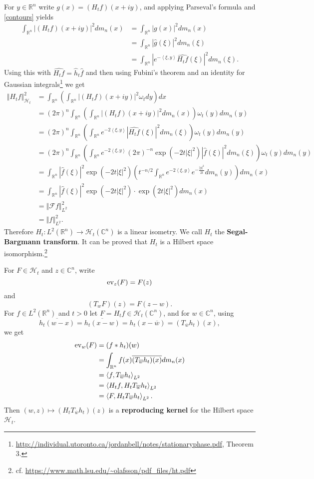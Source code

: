 \documentclass{article}
\newcommand{\inner}[2]{\left\langle #1, #2 \right\rangle}
\newcommand{\ev}{\ensuremath\mathrm{ev}}
\newcommand{\norm}[1]{\left\Vert #1 \right\Vert}
\theoremstyle{definition}
\begin{document}
For $y \in \mathbb{R}^n$ write $g(x)=(H_t f)(x+iy)$, and  
 applying Parseval's formula and
\eqref{contours} yields
\begin{align*}
\int_{\mathbb{R}^n} |(H_t f)(x+iy)|^2 dm_n(x)&= \int_{\mathbb{R}^n} |g(x)|^2 dm_n(x)\\
&=\int_{\mathbb{R}^n} |\widehat{g}(\xi)|^2 dm_n(\xi)\\
&=\int_{\mathbb{R}^n} |e^{-\inner{\xi}{y}} \widehat{H_t f}(\xi)|^2 dm_n(\xi).
\end{align*}
Using this with $\widehat{H_t f} = \widehat{h}_t \widehat{f}$ and then using Fubini's
theorem and an identity for Gaussian integrals\footnote{\url{http://individual.utoronto.ca/jordanbell/notes/stationaryphase.pdf},
Theorem 3.} we get
\begin{align*}
\norm{H_t f}_{\mathcal{H}_t}^2&=\int_{\mathbb{R}^n} \left( \int_{\mathbb{R}^n}
 |(H_t f)(x+iy)|^2 \omega_t dy \right) dx\\
 &=(2\pi)^n \int_{\mathbb{R}^n} \left( \int_{\mathbb{R}^n} |(H_t f)(x+iy)|^2 dm_n(x) \right) \omega_t(y)
 dm_n(y)\\
 &=(2\pi)^n \int_{\mathbb{R}^n} \left( \int_{\mathbb{R}^n}
 e^{-2\inner{\xi}{y}} |\widehat{H_t f}(\xi)|^2 dm_n(\xi)\right) \omega_t(y) dm_n(y)\\
 &=(2\pi)^n \int_{\mathbb{R}^n} \left( \int_{\mathbb{R}^n} e^{-2\inner{\xi}{y}} (2\pi)^{-n} \exp(-2t|\xi|^2)
 |\widehat{f}(\xi)|^2 dm_n(\xi)\right) \omega_t(y) dm_n(y)\\
 &=\int_{\mathbb{R}^n}   |\widehat{f}(\xi)|^2 \exp(-2t|\xi|^2)  \left(t^{-n/2} \int_{\mathbb{R}^n} 
 e^{-2\inner{\xi}{y}}  e^{-\frac{|y|^2}{2t}}dm_n(y) \right)dm_n(x)\\
 &=\int_{\mathbb{R}^n}   |\widehat{f}(\xi)|^2 \exp(-2t|\xi|^2) \cdot  \exp(2t|\xi|^2) dm_n(x)\\
 &=\norm{\mathscr{F}f}_{L^2}^2\\
 &=\norm{f}_{L^2}^2.
\end{align*}
Therefore $H_t:L^2(\mathbb{R}^n) \to \mathcal{H}_t(\mathbb{C}^n)$ is a linear
isometry. 
We call $H_t$ the \textbf{Segal-Bargmann transform}. It can be proved that $H_t$ is a Hilbert space isomorphism.\footnote{cf.
\url{https://www.math.lsu.edu/~olafsson/pdf_files/ht.pdf}}


For $F \in \mathcal{H}_t$ and $z \in \mathbb{C}^n$, write
\[
\ev_z(F) = F(z)
\]
and 
\[
(T_w F)(z)=F(z-w).
\]
For $f \in L^2(\mathbb{R}^n)$ and $t>0$ let $F=H_t f \in \mathcal{H}_t(\mathbb{C}^n)$, and for $w \in \mathbb{C}^n$,
using 
\[
\overline{h_t(w-x)} = \overline{h_t(x-w)} =  h_t(x-\overline{w}) = (T_{\overline{w}}h_t)(x),
\]
we get
\begin{align*}
\ev_w(F)&=(f*h_t)(w)\\
&=\int_{\mathbb{R}^n} f(x) \overline{(T_{\overline{w}}h_t)(x)} dm_n(x)\\
&=\inner{f}{T_{\overline{w}}h_t}_{L^2}\\
&=\inner{H_t f}{H_t T_{\overline{w}}h_t}_{L^2}\\
&=\inner{F}{H_t T_{\overline{w}}h_t}_{L^2}.
\end{align*}
Then $(w,z) \mapsto (H_t T_{\overline{w}}h_t)(z)$ is a \textbf{reproducing kernel} for the Hilbert space
$\mathcal{H}_t$. 
\end{document}
